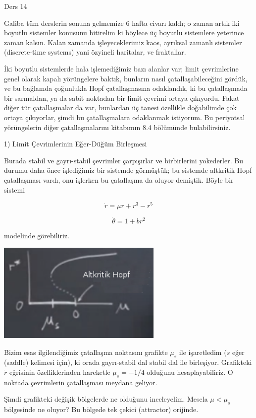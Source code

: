 \documentclass[12pt,fleqn]{article}\usepackage{../../common}
\begin{document}
Ders 14

Galiba tüm derslerin sonuna gelmemize 6 hafta civarı kaldı; o zaman artık
iki boyutlu sistemler konusunu bitirelim ki böylece üç boyutlu sistemlere
yeterince zaman kalsın. Kalan zamanda işleyeceklerimiz kaos, ayrıksal
zamanlı sistemler (discrete-time systems) yani özyineli haritalar, ve
fraktallar.

İki boyutlu sistemlerde hala işlemediğimiz bazı alanlar var; limit
çevrimlerine genel olarak kapalı yörüngelere baktık, bunların nasıl
çatallaşabileceğini gördük, ve bu bağlamda çoğunlukla Hopf çatallaşmasına
odaklandık, ki bu çatallaşmada bir sarmaldan, ya da sabit noktadan bir
limit çevrimi ortaya çıkıyordu. Fakat diğer tür çatallaşmalar da var,
bunlardan üç tanesi özellikle doğabilimde çok ortaya çıkıyorlar, şimdi bu
çatallaşmalara odaklanmak istiyorum. Bu periyotsal yörüngelerin diğer
çatallaşmalarını kitabımın 8.4 bölümünde bulabilirsiniz. 

1) Limit Çevrimlerinin Eğer-Düğüm Birleşmesi

Burada stabil ve gayrı-stabil çevrimler çarpışırlar ve birbirlerini
yokederler. Bu durumu daha önce işlediğimiz bir sistemde görmüştük; bu
sistemde altkritik Hopf çatallaşması vardı, onu işlerken bu çatallaşma da
oluyor demiştik. Böyle bir sistemi 

$$ \dot{r} = \mu r + r^3 - r^5$$

$$ \dot{\theta} = 1 + b r^2$$

modelinde görebiliriz.  

\includegraphics[width=8cm]{14_01.png}

Bizim esas ilgilendiğimiz çatallaşma noktasını grafikte $\mu_s$ ile
işaretledim ($s$ eğer (saddle) kelimesi için), ki orada gayrı-stabil dal
stabil dal ile birleşiyor. Grafikteki $\dot{r}$ eğrisinin özelliklerinden
hareketle $\mu_s = -1/4$ olduğunu hesaplayabiliriz. O noktada çevrimlerin
çatallaşması meydana geliyor.

Şimdi grafikteki değişik bölgelerde ne olduğunu inceleyelim. Mesela
$\mu < \mu_s$ bölgesinde ne oluyor? Bu bölgede tek çekici (attractor)
orijinde.
\end{document}
